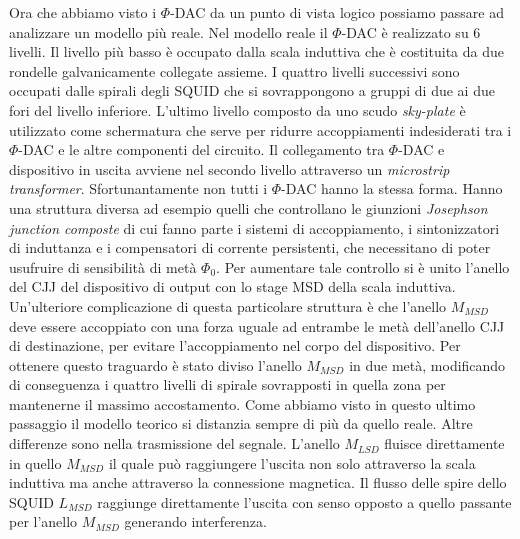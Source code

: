 \cite{ACI}Ora che abbiamo visto i $\Phi$-DAC da un punto di vista logico possiamo passare ad analizzare un modello più reale. Nel modello reale il $\Phi$-DAC è realizzato su 6 livelli. Il livello più basso è occupato dalla scala induttiva che è costituita da due rondelle galvanicamente collegate assieme. I quattro livelli successivi sono occupati dalle spirali degli SQUID che si sovrappongono a gruppi di due ai due fori del livello inferiore. L'ultimo livello composto da uno scudo \textit{sky-plate} è utilizzato come schermatura che serve per ridurre accoppiamenti indesiderati tra i $\Phi$-DAC e le altre componenti del circuito. Il collegamento tra $\Phi$-DAC e dispositivo in uscita avviene nel secondo livello attraverso un \textit{microstrip transformer}. Sfortunantamente non tutti i $\Phi$-DAC hanno la stessa forma. Hanno una struttura diversa ad esempio quelli che controllano le giunzioni \textit{Josephson junction composte}  di cui fanno parte i sistemi di accoppiamento, i sintonizzatori di induttanza e i compensatori di corrente persistenti, che necessitano di poter usufruire di sensibilità di metà $\Phi_0$. Per aumentare tale controllo si è unito l'anello del CJJ del dispositivo di output con lo stage MSD della scala induttiva. Un'ulteriore complicazione di questa particolare struttura è che l'anello $M_{MSD}$ deve essere accoppiato con una forza uguale ad entrambe le metà dell'anello CJJ di destinazione, per evitare l'accoppiamento nel corpo del dispositivo. Per ottenere questo traguardo è stato diviso l'anello $M_{MSD}$ in due metà, modificando di conseguenza i quattro livelli di spirale sovrapposti in quella zona per mantenerne il massimo accostamento.
Come abbiamo visto in questo ultimo passaggio il modello teorico si distanzia sempre di più da quello reale. Altre differenze sono nella trasmissione del segnale. L'anello $M_{LSD}$ fluisce direttamente in quello $M_{MSD}$ il quale può raggiungere l'uscita non solo attraverso la scala induttiva ma anche attraverso la connessione magnetica. Il flusso delle spire dello SQUID $L_{MSD}$ raggiunge direttamente l'uscita con senso opposto a quello passante per l'anello $M_{MSD}$ generando interferenza.
